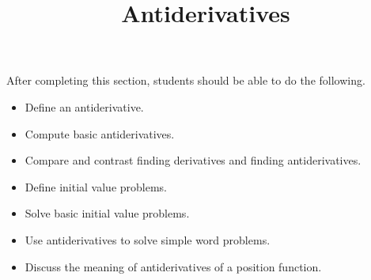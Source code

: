 \documentclass{ximera}
\title{Antiderivatives}
\begin{document}
\begin{abstract}
\end{abstract}

\maketitle

\begin{sectionOutcomes}

After completing this section, students should be able to do the following.

\begin{itemize}
	\item Define an antiderivative.
	\item Compute basic antiderivatives.
	\item Compare and contrast finding derivatives and finding antiderivatives.
	\item Define initial value problems.
	\item Solve basic initial value problems.
	\item Use antiderivatives to solve simple word problems.
	\item Discuss the meaning of antiderivatives of a position function.
\end{itemize}

\end{sectionOutcomes}
\end{document}
